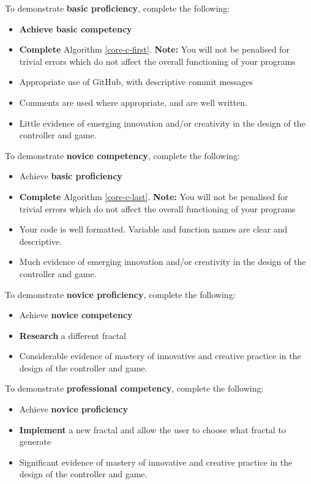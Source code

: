 \documentclass{../../../fal_assignment}
\begin{document}
	To demonstrate \textbf{basic proficiency}, complete the following:
	\begin{itemize}
		\item \textbf{Achieve basic competency}
		\item \textbf{Complete} Algorithm \ref{core-c-first}. \textbf{Note:} You will not be penalised for trivial errors which do not
		affect the overall functioning of your programs
		\item Appropriate use of GitHub, with descriptive commit messages 
		\item Comments are used where appropriate, and are well written.
		\item Little evidence of emerging innovation and/or creativity in the design of the controller and game.
	\end{itemize}
	
	To demonstrate \textbf{novice competency}, complete the following:
	\begin{itemize}
		\item Achieve \textbf{basic proficiency}
		\item \textbf{Complete} Algorithm \ref{core-c-last}. \textbf{Note:} You will not be penalised for trivial errors which do not
		affect the overall functioning of your programs
		\item Your code is well formatted. Variable and function names are clear and descriptive.
		\item Much evidence of emerging innovation and/or creativity in the design of the controller and game.
	\end{itemize}
	
	To demonstrate \textbf{novice proficiency}, complete the following:
	\begin{itemize}
		\item Achieve \textbf{novice competency}
		\item \textbf{Research} a different fractal
		\item Considerable evidence of mastery of innovative and creative practice in the design of the controller and game.
	\end{itemize}
	
	To demonstrate \textbf{professional competency}, complete the following:
	\begin{itemize}
		\item Achieve \textbf{novice proficiency}
		\item \textbf{Implement} a new fractal and allow the user to choose what fractal to generate
		\item Significant evidence of mastery of innovative and creative practice  in the design of the controller and game.
	\end{itemize}
	
	
\end{document}
